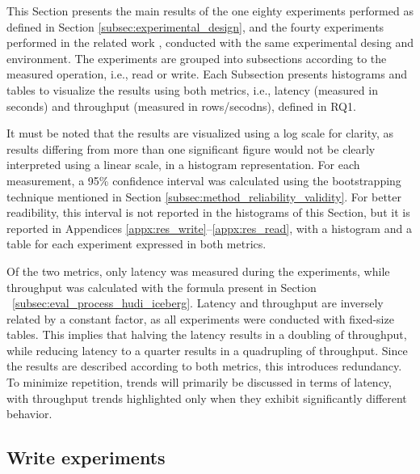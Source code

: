 
This Section presents the main results of the one eighty experiments performed as defined in Section \ref{subsec:experimental_design}, and the fourty experiments performed in the related work \cite{manfrediReducingReadWrite2024}, conducted with the same experimental desing and environment. The experiments are grouped into subsections according to the measured operation, i.e., read or write. Each Subsection presents histograms and tables to visualize the results using both metrics, i.e., latency (measured in seconds) and throughput (measured in rows/secodns), defined in \gls{RQ}1.

It must be noted that the results are visualized using a log scale for clarity, as results differing from more than one significant figure would not be clearly interpreted using a linear scale, in a histogram representation. For each measurement, a 95\% confidence interval was calculated using the bootstrapping technique mentioned in Section \ref{subsec:method_reliability_validity}. For better readibility, this interval is not reported in the histograms of this Section, but it is reported in Appendices \ref{appx:res_write}--\ref{appx:res_read}, with a histogram and a table for each experiment expressed in both metrics.

Of the two metrics, only latency was measured during the experiments, while throughput was calculated with the formula present in Section ~\ref{subsec:eval_process_hudi_iceberg}. Latency and throughput are inversely related by a constant factor, as all experiments were conducted with fixed-size tables. This implies that halving the latency results in a doubling of throughput, while reducing latency to a quarter results in a quadrupling of throughput. Since the results are described according to both metrics, this introduces redundancy. To minimize repetition, trends will primarily be discussed in terms of latency, with throughput trends highlighted only when they exhibit significantly different behavior.



\subsection{Write experiments}

